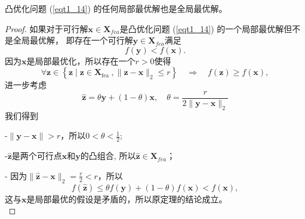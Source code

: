 \begin{theorem}
    凸优化问题 (\ref{eqt1_14}) 的任何局部最优解也是全局最优解。
    \label{the1_4}
\end{theorem}
\begin{proof}
    如果对于可行解$  \bm{x} \in \bm{X}_{f e a} $是凸优化问题 (\ref{eqt1_14}) 的一个局部最优解但不是全局最优解， 即存在一个可行解$  \bm{y} \in \bm{X}_{f e a}  $满足
    \begin{equation}
    f(\bm{y})<f(\bm{x}) .
        \nonumber
    \end{equation}
因为$\bm{x}$是局部最优化，所以存在一个$  r>0  $使得
    \begin{equation}
    \forall \bm{z} \in\left\{\bm{z} \mid \bm{z} \in \bm{X}_{\text {fea }},\|\bm{z}-\bm{x}\|_{2} \leq r\right\} \quad \Rightarrow \quad f(\bm{z}) \geq f(\bm{x}),
        \nonumber
    \end{equation}
进一步考虑
\begin{equation}
\hat{\bm{z}}=\theta \bm{y}+(1-\theta) \bm{x}, \quad \theta=\frac{r}{2\|\bm{y}-\bm{x}\|_{2}}
    \nonumber
\end{equation}
我们得到
\par -$  \|\bm{y}-\bm{x}\|>r $，所以$  0<\theta<\frac{1}{2} $;
\par -$  \hat{\bm{z}}  $是两个可行点$\bm{x}$和$\bm{y}$的凸组合, 所以$  \hat{\bm{z}} \in \bm{X}_{f e a} $；
\par - 因为$  \|\hat{\bm{z}}-\bm{x}\|_{2}=\frac{r}{2}<r $，所以
\begin{equation}
f(\hat{\bm{z}}) \leq \theta f(\bm{y})+(1-\theta) f(\bm{x})<f(\bm{x}),
    \nonumber
\end{equation}
这与$\bm{x}$是局部最优的假设是矛盾的，所以原定理的结论成立。\\
\end{proof}
